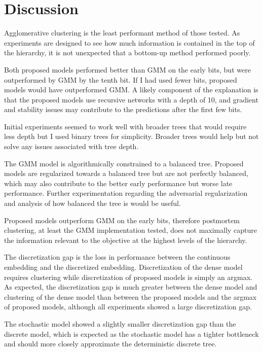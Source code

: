 \documentclass[sigconf]{acmart}
\begin{document}
\section{Discussion}

Agglomerative clustering is the least performant method of those tested. As experiments are designed to see how much information is contained in the top of the hierarchy, it is not unexpected that a bottom-up method performed poorly.

Both proposed models performed better than GMM on the early bits, but were outperformed by GMM by the tenth bit. If I had used fewer bits, proposed models would have outperformed GMM. A likely component of the explanation is that the proposed models use recursive networks with a depth of 10, and gradient and stability issues may contribute to the predictions after the first few bits.

Initial experiments seemed to work well with broader trees that would require less depth but I used binary trees for simplicity. Broader trees would help but not solve any issues associated with tree depth.

The GMM model is algorithmically constrained to a balanced tree. Proposed models are regularized towards a balanced tree but are not perfectly balanced, which may also contribute to the better early performance but worse late performance. Further experimentation regarding the adversarial regularization and analysis of how balanced the tree is would be useful.

Proposed models outperform GMM on the early bits, therefore postmortem clustering, at least the GMM implementation tested, does not maximally capture the information relevant to the objective at the highest levels of the hierarchy.

The discretization gap is the loss in performance between the continuous embedding and the discretized embedding. Discretization of the dense model requires clustering while discretization of proposed models is simply an argmax. As expected, the discretization gap is much greater between the dense model and clustering of the dense model than between the proposed models and the argmax of proposed models, although all experiments showed a large discretization gap.

The stochastic model showed a slightly smaller discretization gap than the discrete model, which is expected as the stochastic model has a tighter bottleneck and should more closely approximate the deterministic discrete tree.
\end{document}
